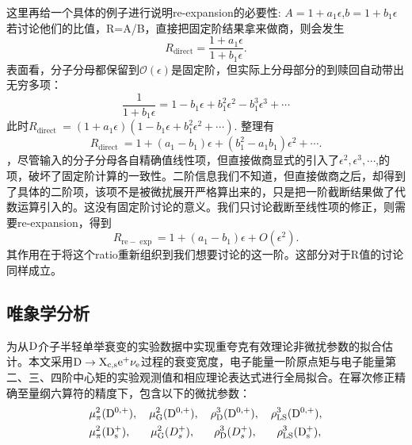 这里再给一个具体的例子进行说明re-expansion的必要性: $A=1+a_1\epsilon$,$b=1+b_1\epsilon$ 若讨论他们的比值，R=A/B，直接把固定阶结果拿来做商，则会发生
\begin{equation}
R_{\mathrm{direct}}=\frac{1+a_1 \epsilon}{1+b_1 \epsilon} .
\end{equation}
表面看，分子分母都保留到$\mathcal{O}(\epsilon)$是固定阶，但实际上分母部分的到赎回自动带出无穷多项：
\begin{equation}
\frac{1}{1+b_1 \epsilon}=1-b_1 \epsilon+b_1^2 \epsilon^2-b_1^3 \epsilon^3+\cdots
\end{equation}
此时$R_{\text {direct }}=\left(1+a_1 \epsilon\right)\left(1-b_1 \epsilon+b_1^2 \epsilon^2+\cdots\right)$. 整理有$$
R_{\text {direct }}=1+\left(a_1-b_1\right) \epsilon+\left(b_1^2-a_1 b_1\right) \epsilon^2+\cdots .
$$，尽管输入的分子分母各自精确值线性项，但直接做商显式的引入了$\epsilon^2,\epsilon^3,\cdots$,的项，破坏了固定阶计算的一致性。二阶信息我们不知道，但直接做商之后，却得到了具体的二阶项，该项不是被微扰展开严格算出来的，只是把一阶截断结果做了代数运算引入的。这没有固定阶讨论的意义。我们只讨论截断至线性项的修正，则需要re-expansion，得到
\begin{equation}
R_{\mathrm{re}-\exp }=1+\left(a_1-b_1\right) \epsilon+O\left(\epsilon^2\right) .
\end{equation}
其作用在于将这个ratio重新组织到我们想要讨论的这一阶。这部分对于R值的讨论同样成立。
\subsection{唯象学分析}
为从$\mathrm{D}$介子半轻单举衰变的实验数据中实现重夸克有效理论非微扰参数的拟合估计。本文采用$\mathrm{D\to X_{\rm{c},\rm{s}} e^+ \nu_{e}}$过程的衰变宽度，电子能量一阶原点矩与电子能量第二、三、四阶中心矩的实验观测值和相应理论表达式进行全局拟合。在幂次修正精确至量纲六算符的精度下，包含以下的微扰参数：
\begin{equation}
    \begin{aligned}
        &\mu_{\pi}^2(\mathrm{D^{0,+}}),\quad \mu_{\mathrm{G}}^{2}(\mathrm{D^{0,+}}),\quad \rho_{\mathrm{D}}^3(\mathrm{D^{0,+}}),\quad \rho_{\mathrm{LS}}^3(\mathrm{D^{0,+}}), \\
        &\mu_{\pi}^2(\mathrm{D_s^+}),\quad\;\:\; \mu_{\mathrm{G}}^{2}(D_s^+),\quad\;\:\: \rho_{\mathrm{D}}^3(D_s^+),\quad\;\:\; \rho_{\mathrm{LS}}^3(\mathrm{D_s^+}),
    \end{aligned}
    \end{equation}
    
    
    
    

